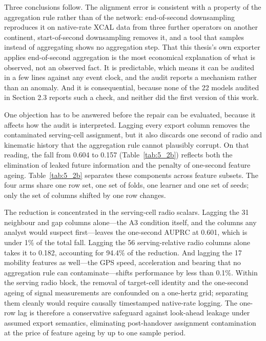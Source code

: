 Three conclusions follow. The alignment error is consistent with a property of the aggregation rule rather than of the network: end-of-second downsampling reproduces it on native-rate XCAL data from three further operators on another continent, start-of-second downsampling removes it, and a tool that samples instead of aggregating shows no aggregation step. That this thesis's own exporter applies end-of-second aggregation is the most economical explanation of what is observed, not an observed fact. It is predictable, which means it can be audited in a few lines against any event clock, and the audit reports a mechanism rather than an anomaly. And it is consequential, because none of the 22 models audited in Section 2.3 reports such a check, and neither did the first version of this work.

One objection has to be answered before the repair can be evaluated, because it affects how the audit is interpreted. Lagging every export column removes the contaminated serving-cell assignment, but it also discards one second of radio and kinematic history that the aggregation rule cannot plausibly corrupt. On that reading, the fall from 0.604 to 0.157 (Table~\ref{tab:5_2b}) reflects both the elimination of leaked future information and the penalty of one-second feature ageing. Table~\ref{tab:5_2b} separates these components across feature subsets. The four arms share one row set, one set of folds, one learner and one set of seeds; only the set of columns shifted by one row changes.

The reduction is concentrated in the serving-cell radio scalars. Lagging the 31 neighbour and gap columns alone---the A3 condition itself, and the columns any analyst would suspect first---leaves the one-second AUPRC at 0.601, which is under 1\% of the total fall. Lagging the 56 serving-relative radio columns alone takes it to 0.182, accounting for 94.4\% of the reduction. And lagging the 17 mobility features as well---the GPS speed, acceleration and bearing that no aggregation rule can contaminate---shifts performance by less than 0.1\%. Within the serving radio block, the removal of target-cell identity and the one-second ageing of signal measurements are confounded on a one-hertz grid; separating them cleanly would require causally timestamped native-rate logging. The one-row lag is therefore a conservative safeguard against look-ahead leakage under assumed export semantics, eliminating post-handover assignment contamination at the price of feature ageing by up to one sample period.

